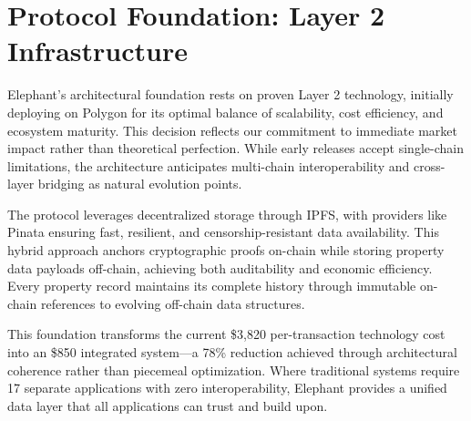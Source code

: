 \section{Protocol Foundation: Layer 2 Infrastructure}

Elephant's architectural foundation rests on proven Layer 2 technology, initially deploying on Polygon for its optimal balance of scalability, cost efficiency, and ecosystem maturity. This decision reflects our commitment to immediate market impact rather than theoretical perfection. While early releases accept single-chain limitations, the architecture anticipates multi-chain interoperability and cross-layer bridging as natural evolution points.

The protocol leverages decentralized storage through IPFS, with providers like Pinata ensuring fast, resilient, and censorship-resistant data availability. This hybrid approach anchors cryptographic proofs on-chain while storing property data payloads off-chain, achieving both auditability and economic efficiency. Every property record maintains its complete history through immutable on-chain references to evolving off-chain data structures.

This foundation transforms the current \$3,820 per-transaction technology cost into an \$850 integrated system—a 78\% reduction achieved through architectural coherence rather than piecemeal optimization. Where traditional systems require 17 separate applications with zero interoperability, Elephant provides a unified data layer that all applications can trust and build upon.

